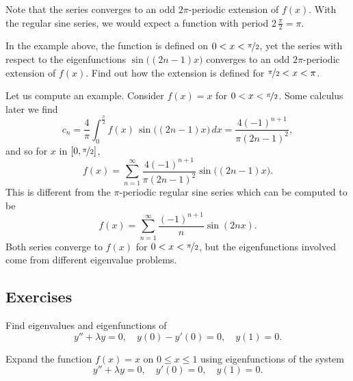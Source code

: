 \begin{example}
Note that the series converges to an odd $2\pi$-periodic
extension of $f(x)$.  With the regular sine series, we would expect
a function with period $2 \, \frac{\pi}{2} = \pi$.

\begin{exercise}[challenging]
In the example above, the function is defined on $0 < x < \nicefrac{\pi}{2}$,
yet the series with respect to the eigenfunctions
$\sin \bigl( (2n-1)x \bigr)$ converges to an odd $2\pi$-periodic extension of $f(x)$.
Find out how the extension is defined for $\nicefrac{\pi}{2} < x < \pi$.
\end{exercise}

Let us compute an example.
Consider $f(x) = x$ for $0 < x <  \nicefrac{\pi}{2}$.  Some
calculus later we find
\begin{equation*}
c_n = 
\frac{4}{\pi} \int_0^{\frac{\pi}{2}} f(x) \,\sin \bigl( (2n-1)x \bigr) \, dx 
=
\frac{4{(-1)}^{n+1}}{\pi {(2n-1)}^2} ,
\end{equation*}
and so for $x$ in $[0,\nicefrac{\pi}{2}]$,
\begin{equation*}
f(x) = \sum_{n=1}^\infty \frac{4{(-1)}^{n+1}}{\pi {(2n-1)}^2}
\sin \bigl( (2n-1)x \bigr) .
\end{equation*}
This is different from the $\pi$-periodic regular sine series which can
be computed to be
\begin{equation*}
f(x) = \sum_{n=1}^\infty \frac{{(-1)}^{n+1}}{n}  \sin ( 2nx ) .
\end{equation*}
Both series converge to $f(x)$ for $0 < x < \nicefrac{\pi}{2}$, but
the eigenfunctions involved come from different eigenvalue problems.
\end{example}

\subsection{Exercises}

\begin{exercise}
Find eigenvalues and eigenfunctions of
\begin{equation*}
y''+\lambda y = 0, \quad y(0)- y'(0) = 0, \quad y(1) = 0 .
\end{equation*}
\end{exercise}

\begin{exercise}
Expand the function $f(x) = x$ on $0 \leq x \leq 1$ using eigenfunctions
of the system
\begin{equation*}
y'' + \lambda y = 0, \quad y'(0) = 0, \quad y(1) = 0 .
\end{equation*}
\end{exercise}

